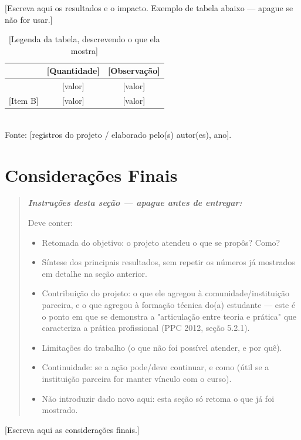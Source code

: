 \documentclass[article,12pt,a4paper,oneside]{abntex2}
\newenvironment{instrucoes}{%
  \begin{quotation}\footnotesize\itshape
  \noindent\textbf{\upshape Instruções desta seção — apague antes de entregar:}\par\smallskip
}{%
  \end{quotation}
}
\begin{document}
[Escreva aqui os resultados e o impacto. Exemplo de tabela abaixo — apague se não for usar.]

\begin{table}[!ht]
  \centering
  \caption{[Legenda da tabela, descrevendo o que ela mostra]}
  \begin{tabular}{lcc}
    \hline
    [Categoria de atendimento] & [Quantidade] & [Observação] \\
    \hline
    [Item A] & [valor] & [valor] \\{}
    [Item B] & [valor] & [valor] \\
    \hline
  \end{tabular}
  \\[0.3em]
  {\footnotesize Fonte: [registros do projeto / elaborado pelo(s) autor(es), ano].}
\end{table}

\section{Considerações Finais}

\begin{instrucoes}
Deve conter:
\begin{itemize}
  \item Retomada do objetivo: o projeto atendeu o que se propôs? Como?
  \item Síntese dos principais resultados, sem repetir os números já mostrados em detalhe na seção anterior.
  \item Contribuição do projeto: o que ele agregou à comunidade/instituição parceira, e o que agregou à formação técnica do(a) estudante — este é o ponto em que se demonstra a "articulação entre teoria e prática" que caracteriza a prática profissional (PPC 2012, seção 5.2.1).
  \item Limitações do trabalho (o que não foi possível atender, e por quê).
  \item Continuidade: se a ação pode/deve continuar, e como (útil se a instituição parceira for manter vínculo com o curso).
  \item Não introduzir dado novo aqui: esta seção só retoma o que já foi mostrado.
\end{itemize}
\end{instrucoes}

[Escreva aqui as considerações finais.]

\postextual
\end{document}
